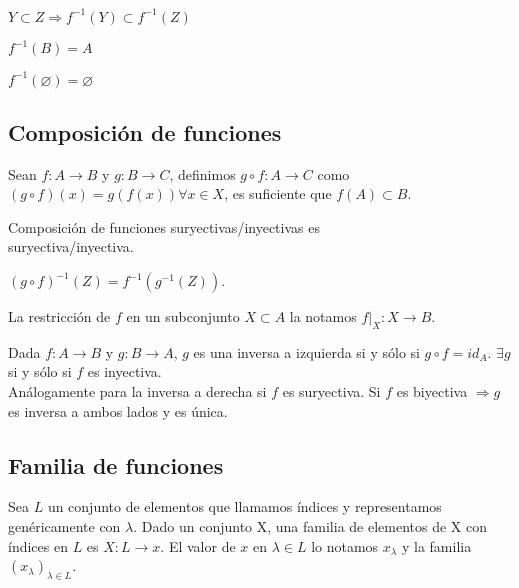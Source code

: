 \begin{prop}
    $Y \subset Z \Rightarrow f^{-1}(Y) \subset f^{-1}(Z)$
\end{prop}

\begin{prop}
    $f^{-1}(B) = A$
\end{prop}

\begin{prop}
    $f^{-1}(\varnothing) = \varnothing$
\end{prop}

\subsection{Composición de funciones}

Sean $f: A \to B$ y $g: B \to C$, definimos $g \circ f: A \to C$ como $(g \circ f)(x) = g(f(x)) \forall x \in X$, es suficiente que $f(A) \subset B$.

\begin{prop}
    Composición de funciones suryectivas/inyectivas es \\ suryectiva/inyectiva.
\end{prop}

\begin{prop}
    $(g \circ f)^{-1}(Z) = f^{-1}(g^{-1}(Z))$.
\end{prop}

\begin{definition}
    La restricción de $f$ en un subconjunto $X \subset A$ la notamos $f|_X: X \to B$.
\end{definition}

\begin{definition}
    Dada $f: A \to B$ y $g: B \to A$, $g$ es una inversa a izquierda si y sólo si $g \circ f = id_A$. $\exists g$ si y sólo si $f$ es inyectiva. \\
    Análogamente para la inversa a derecha si $f$ es suryectiva.
    Si $f$ es biyectiva $\Rightarrow g$ es inversa a ambos lados y es única.
\end{definition}

\subsection{Familia de funciones}

Sea $L$ un conjunto de elementos que llamamos índices y representamos genéricamente con $\lambda$. Dado un conjunto X, una familia de elementos de X con índices en $L$ es $X: L \to x$.
El valor de $x$ en $\lambda \in L$ lo notamos $x_\lambda$ y la familia $(x_\lambda)_{\lambda \in L}$.

